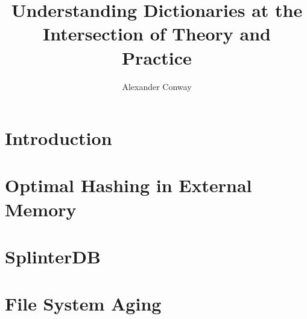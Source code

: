 \documentclass{ruthesis}
\begin{document}
\phd

\title{Understanding Dictionaries at the Intersection of Theory and Practice}
\author{Alexander Conway}



\beforepreface
{}
\dedication{The body of the dedication}
\afterpreface

\chapter{Introduction}


\chapter{Optimal Hashing in External Memory}








\chapter{SplinterDB}









\chapter{File System Aging}




\end{document}
